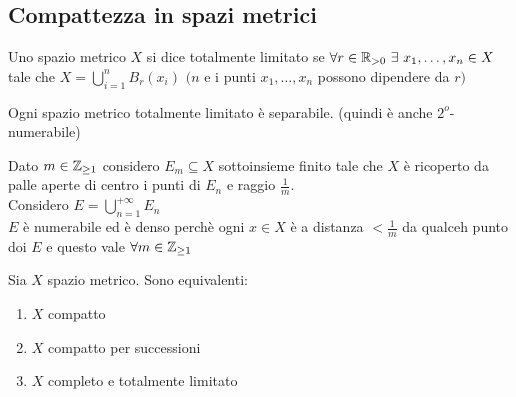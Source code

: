 \documentclass[12px]{article}
\begin{document}
	\subsection{Compattezza in spazi metrici}
	\begin{defi}
		Uno spazio metrico $X$ si dice totalmente limitato se $\forall r\in\mathbb{R}_{>0} \ \exists\ x_1,\ldots,x_n\in X$ tale che $\displaystyle X = \bigcup^{n}_{i=1}B_r(x_i)$ $(n$ e i punti $x_1,\ldots,x_n$ possono dipendere da $r)$
	\end{defi}
	\begin{lemm}
		Ogni spazio metrico totalmente limitato è separabile. (quindi è anche $2^o$-numerabile)
	\end{lemm}
	\begin{dimo}
		Dato $m\in\mathbb{Z}_{\geq 1}$ considero  $E_m\subseteq X$ sottoinsieme finito tale che $X$ è ricoperto da palle aperte di centro i punti di $E_n$ e raggio $\frac 1m$. \\
		Considero $E = \bigcup^{+\infty}_{n= 1}E_n$ \\
		$E$ è numerabile ed è denso perchè ogni $x\in X $ è a distanza $< \frac 1m$ da qualceh punto doi $E$ e questo vale $\forall m\in \mathbb{Z}_{\geq 1}$
	\end{dimo}
	\begin{teo}
		Sia $X$ spazio metrico. Sono equivalenti:
		\begin{enumerate}
			\item $X$ compatto
			\item $X$ compatto per successioni
			\item $X $ completo e totalmente limitato
		\end{enumerate}
	\end{teo}
\end{document}
